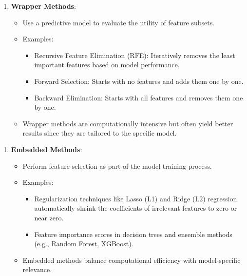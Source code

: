 \documentclass{article}
\providecommand{\tightlist}{%
      \setlength{\itemsep}{0pt}\setlength{\parskip}{0pt}}
\begin{document}
\begin{enumerate}
\def\labelenumi{\arabic{enumi}.}
\setcounter{enumi}{1}
\tightlist
\item
  \textbf{Wrapper Methods}:

  \begin{itemize}
  \tightlist
  \item
    Use a predictive model to evaluate the utility of feature subsets.
  \item
    Examples:

    \begin{itemize}
    \tightlist
    \item
      Recursive Feature Elimination (RFE): Iteratively removes the least
      important features based on model performance.
    \item
      Forward Selection: Starts with no features and adds them one by
      one.
    \item
      Backward Elimination: Starts with all features and removes them
      one by one.
    \end{itemize}
  \item
    Wrapper methods are computationally intensive but often yield better
    results since they are tailored to the specific model.
  \end{itemize}
\end{enumerate}

\begin{enumerate}
\def\labelenumi{\arabic{enumi}.}
\setcounter{enumi}{2}
\tightlist
\item
  \textbf{Embedded Methods}:

  \begin{itemize}
  \tightlist
  \item
    Perform feature selection as part of the model training process.
  \item
    Examples:

    \begin{itemize}
    \tightlist
    \item
      Regularization techniques like Lasso (L1) and Ridge (L2)
      regression automatically shrink the coefficients of irrelevant
      features to zero or near zero.
    \item
      Feature importance scores in decision trees and ensemble methods
      (e.g., Random Forest, XGBoost).
    \end{itemize}
  \item
    Embedded methods balance computational efficiency with
    model-specific relevance.
  \end{itemize}
\end{enumerate}
\end{document}
